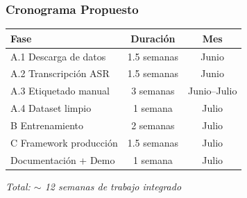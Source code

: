 \documentclass[aspectratio=169,10pt]{beamer}
\begin{document}
\begin{frame}
  \frametitle{Cronograma Propuesto}
  
  \begin{center}
    \begin{tabular}{l|c|c}
      \toprule
      \textbf{Fase} & \textbf{Duración} & \textbf{Mes} \\
      \midrule
      A.1 Descarga de datos & 1.5 semanas & Junio \\
      A.2 Transcripción ASR & 1.5 semanas & Junio \\
      A.3 Etiquetado manual & 3 semanas & Junio--Julio \\
      A.4 Dataset limpio & 1 semana & Julio \\
      \midrule
      B Entrenamiento & 2 semanas & Julio \\
      \midrule
      C Framework producción & 1.5 semanas & Julio \\
      \midrule
      Documentación + Demo & 1 semana & Julio \\
      \bottomrule
    \end{tabular}
  \end{center}

  \vspace{0.5cm}
  \textit{\small Total: $\sim$ 12 semanas de trabajo integrado}
\end{frame}
\end{document}
